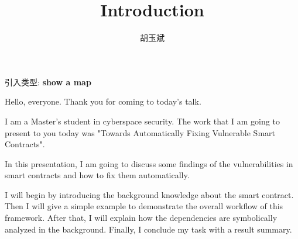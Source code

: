 \documentclass[onecolumn,oneside]{BUPTHomework}
\author{胡玉斌}
\title{Introduction}
\begin{document}
  \maketitle

  引入类型: \textbf{show a map}

Hello, everyone. Thank you for coming to today's talk.

I am a Master's student in cyberspace security. The work that I am going to present to you today was  "Towards Automatically Fixing Vulnerable Smart Contracts". 

In this presentation, I am going to discuss some findings of the vulnerabilities in smart contracts and how to fix them automatically. 

I will begin by introducing the background knowledge about the smart contract. Then I will give a simple example to demonstrate the overall workflow of this framework. After that, I will explain how the dependencies are symbolically analyzed in the background. Finally, I conclude my task with a result summary.
  
\end{document}

